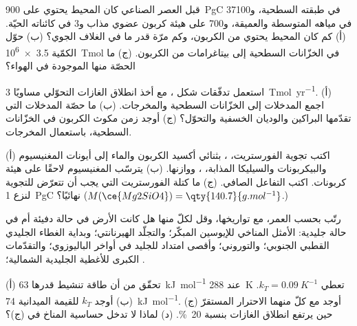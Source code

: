 \begin{exercise}[$\star$]\label{exo:b2:deep-time-climate:1}
قبل العصر الصناعي كان المحيط يحتوي على \qty{900}{PgC} في طبقته السطحية، و\num{37100} في
مياهه المتوسطة والعميقة، و700 على هيئة كربون عضوي مذاب و3 في كائناته الحيّة.
(أ) كم كان المحيط يحتوي من الكربون، وكم مرّة قدر ما في الغلاف الجوي؟ (ب) حوّل
الكمّية \qty{3.5e6}{Tmol} في الخزّانات السطحية إلى بيتاغرامات من الكربون. (ج) ما الحصّة منها الموجودة في
الهواء؟
\end{exercise}

\begin{exercise}[$\star$]\label{exo:b2:deep-time-climate:2}
استعمل تدفّقات شكل ، مع أخذ انطلاق الغازات التحوّلي مساويًا
\qty{3}{Tmol.yr^{-1}}. (أ) اجمع المدخلات إلى الخزّانات السطحية والمخرجات.
(ب) ما حصّة المدخلات التي تقدّمها البراكين والوديان الخسفية والتحوّل؟ (ج) أوجد زمن
مكوث الكربون في الخزّانات السطحية، باستعمال المخرجات.
\end{exercise}

\begin{exercise}[$\star$]\label{exo:b2:deep-time-climate:3}
(أ) اكتب تجوية الفورستريت، ، بثنائي أكسيد الكربون والماء إلى أيونات المغنيسيوم
والبيكربونات والسيليكا المذابة، ، ووازنها. (ب) يترسّب المغنيسيوم لاحقًا
على هيئة كربونات. اكتب التفاعل الصافي. (ج) ما كتلة الفورستريت التي يجب أن تتعرّض للتجوية
لنزع \qty{1}{PgC} نهائيًا؟ ($M(\ce{Mg2SiO4}) = \qty{140.7}{g.mol^{-1}}$.)
\end{exercise}

\begin{exercise}[$\star$]\label{exo:b2:deep-time-climate:4}
رتّب بحسب العمر، مع تواريخها، وقل لكلّ منها هل كانت الأرض في حالة دفيئة أم في
حالة جليدية: الأمثل المناخي للإيوسين المبكّر؛ والتجلّد الهيرنانتي؛ وبداية
الغطاء الجليدي القطبي الجنوبي؛ والتوروني؛ وأقصى امتداد للجليد في أواخر الباليوزوي؛ والتقدّمات
الكبرى للأغطية الجليدية الشمالية؛ .
\end{exercise}

\begin{exercise}[$\star\star$]\label{exo:b2:deep-time-climate:5}
(أ) تحقّق من أن طاقة تنشيط قدرها \qty{63}{kJ.mol^{-1}} عند \qty{288}{K} تعطي $k_T =
\qty{0.09}{K^{-1}}$. (ب) أوجد $k_T$ للقيمة الميدانية \qty{74}{kJ.mol^{-1}}. (ج) أوجد مع كلّ منهما
الاحترار المستقرّ حين يرتفع انطلاق الغازات بنسبة \qty{20}{\percent}. (د) لماذا لا تدخل حساسية
المناخ في (ج)؟
\end{exercise}

